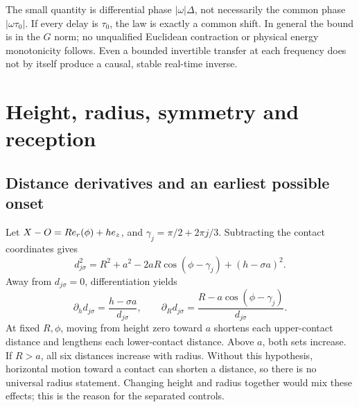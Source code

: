 The small quantity is differential phase $|\omega|\Delta$, not necessarily the common phase $|\omega\tau_0|$. If every delay is $\tau_0$, the law is exactly a common shift. In general the bound is in the $G$ norm; no unqualified Euclidean contraction or physical energy monotonicity follows. Even a bounded invertible transfer at each frequency does not by itself produce a causal, stable real-time inverse.

\section{Height, radius, symmetry and reception}\label{sec:timing}
\subsection{Distance derivatives and an earliest possible onset}
Let $X-O=R e_r(\phi)+he_z$, and $\gamma_j=\pi/2+2\pi j/3$. Subtracting the contact coordinates gives
\begin{equation}\label{eq:distance}
d_{j\sigma}^2=R^2+a^2-2aR\cos(\phi-\gamma_j)+(h-\sigma a)^2.
\end{equation}
Away from $d_{j\sigma}=0$, differentiation yields
\begin{equation}\label{eq:derivatives}
\partial_h d_{j\sigma}=\frac{h-\sigma a}{d_{j\sigma}},\qquad
\partial_R d_{j\sigma}=\frac{R-a\cos(\phi-\gamma_j)}{d_{j\sigma}}.
\end{equation}
At fixed $R,\phi$, moving from height zero toward $a$ shortens each upper-contact distance and lengthens each lower-contact distance. Above $a$, both sets increase. If $R>a$, all six distances increase with radius. Without this hypothesis, horizontal motion toward a contact can shorten a distance, so there is no universal radius statement. Changing height and radius together would mix these effects; this is the reason for the separated controls.

